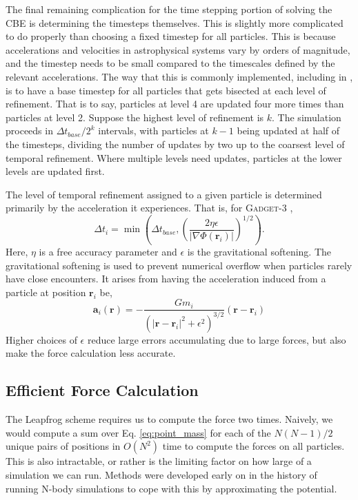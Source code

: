 The final remaining complication for the time stepping portion of solving the CBE is determining the timesteps themselves. This is slightly more complicated to do properly than choosing a fixed timestep for all particles. This is because accelerations and velocities in astrophysical systems vary by orders of magnitude, and the timestep needs to be small compared to the timescales defined by the relevant accelerations. The way that this is commonly implemented, including in \citet{GadgetCodePaper}, is to have a base timestep for all particles that gets bisected at each level of refinement. That is to say, particles at level 4 are updated four more times than particles at level 2. Suppose the highest level of refinement is $k$. The simulation proceeds in $\Delta t_{base} / 2^{k}$ intervals, with particles at $k - 1$ being updated at half of the timesteps, dividing the number of updates by two up to the coarsest level of temporal refinement. Where multiple levels need updates, particles at the lower levels are updated first.

The level of temporal refinement assigned to a given particle is determined primarily by the acceleration it experiences. That is, for \textsc{Gadget-3} \citep{GadgetCodePaper},
\begin{equation}
\Delta t_i = \min\left(\Delta t_{base}, \left(\frac{2 \eta \epsilon}{\vert \nabla \Phi(\textbf{r}_i) \vert} \right)^{1/2}\right).
\end{equation}
Here, $\eta$ is a free accuracy parameter and $\epsilon$ is the gravitational softening. The gravitational softening is used to prevent numerical overflow when particles rarely have close encounters. It arises from having the acceleration induced from a particle at position $\textbf{r}_i$  be,
\begin{equation}
\textbf{a}_i(\textbf{r}) = -\frac{G m_i}{\left(\vert\textbf{r} - \textbf{r}_i\vert^2 + \epsilon^2\right)^{3/2}}(\textbf{r} - \textbf{r}_i) \label{eq:point_mass}
\end{equation}
Higher choices of $\epsilon$ reduce large errors accumulating due to large forces, but also make the force calculation less accurate.

\subsection{Efficient Force Calculation}

The Leapfrog scheme requires us to compute the force two times. Naively, we would compute a sum over Eq. \eqref{eq:point_mass} for each of the $N(N-1)/2$ unique pairs of positions in $O(N^2)$ time to compute the forces on all particles. This is also intractable, or rather is the limiting factor on how large of a simulation we can run. Methods were developed early on in the history of running N-body simulations to cope with this by approximating the potential.


